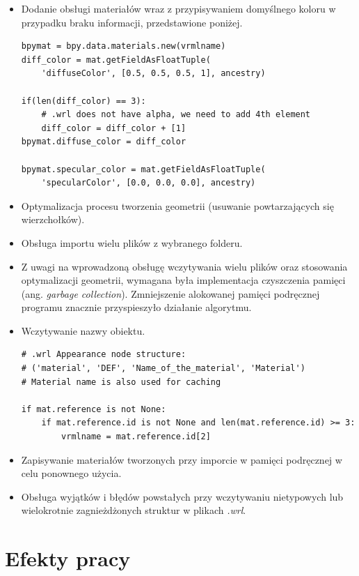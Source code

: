 \documentclass{xmgr}
\begin{document}
\begin{itemize}
\item Dodanie obsługi materiałów wraz z przypisywaniem domyślnego koloru w przypadku braku informacji, przedstawione poniżej.
\begin{lstlisting}
bpymat = bpy.data.materials.new(vrmlname)
diff_color = mat.getFieldAsFloatTuple(
	'diffuseColor', [0.5, 0.5, 0.5, 1], ancestry)

if(len(diff_color) == 3):
    # .wrl does not have alpha, we need to add 4th element
    diff_color = diff_color + [1]
bpymat.diffuse_color = diff_color

bpymat.specular_color = mat.getFieldAsFloatTuple(
	'specularColor', [0.0, 0.0, 0.0], ancestry)
\end{lstlisting}
\item Optymalizacja procesu tworzenia geometrii (usuwanie powtarzających się wierzchołków).
\item Obsługa importu wielu plików z wybranego folderu.
\item Z uwagi na wprowadzoną obsługę wczytywania wielu plików oraz stosowania optymalizacji geometrii, wymagana była implementacja czyszczenia pamięci (ang. \emph{garbage collection}). Zmniejszenie alokowanej pamięci podręcznej programu znacznie przyspieszyło działanie algorytmu.
\item Wczytywanie nazwy obiektu.
\begin{lstlisting}
# .wrl Appearance node structure:
# ('material', 'DEF', 'Name_of_the_material', 'Material')
# Material name is also used for caching

if mat.reference is not None:
    if mat.reference.id is not None and len(mat.reference.id) >= 3:
        vrmlname = mat.reference.id[2]
\end{lstlisting}
\item Zapisywanie materiałów tworzonych przy imporcie w pamięci podręcznej w celu ponownego użycia.
\item Obsługa wyjątków i błędów powstałych przy wczytywaniu nietypowych lub wielokrotnie zagnieżdżonych struktur w plikach \emph{.wrl}.

\end{itemize}

\chapter{Efekty pracy}
\end{document}
